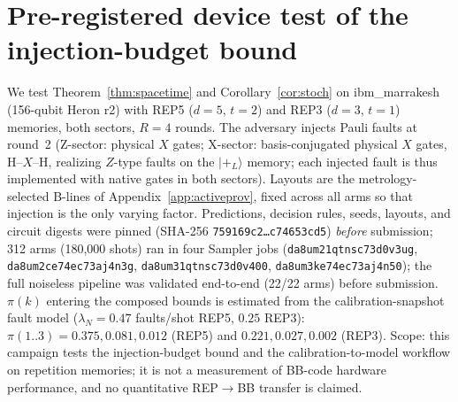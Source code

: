 \documentclass[11pt,a4paper]{article}
\begin{document}
\section{Pre-registered device test of the injection-budget bound}
\label{app:injection}

We test Theorem~\ref{thm:spacetime} and Corollary~\ref{cor:stoch} on
ibm\_marrakesh (156-qubit Heron r2) with REP5 ($d{=}5$, $t{=}2$) and
REP3 ($d{=}3$, $t{=}1$) memories, both sectors, $R{=}4$ rounds.
The adversary injects Pauli faults at round~2 (Z-sector: physical $X$
gates; X-sector: basis-conjugated physical $X$ gates, H--$X$--H, realizing
$Z$-type faults on the $\lvert +_L \rangle$ memory; each injected fault is
thus implemented with native gates in both sectors). Layouts are the metrology-selected B-lines of
Appendix~\ref{app:activeprov}, fixed across all arms so that injection
is the only varying factor. Predictions, decision rules, seeds,
layouts, and circuit digests were pinned (SHA-256
\texttt{759169c2\dots c74653cd5}) \emph{before} submission; 312 arms
(180{,}000 shots) ran in four Sampler jobs
(\texttt{da8um21qtnsc73d0v3ug}, \texttt{da8um2ce74ec73aj4n3g},
\texttt{da8um31qtnsc73d0v400}, \texttt{da8um3ke74ec73aj4n50}); the full
noiseless pipeline was validated end-to-end (22/22 arms) before
submission. $\pi(k)$ entering the composed bounds is estimated from the
calibration-snapshot fault model ($\lambda_N{=}0.47$ faults/shot REP5,
$0.25$ REP3): $\pi(1..3)=0.375, 0.081, 0.012$ (REP5) and
$0.221, 0.027, 0.002$ (REP3). Scope: this campaign tests the
injection-budget bound and the calibration-to-model workflow on
repetition memories; it is not a measurement of BB-code hardware
performance, and no quantitative REP$\to$BB transfer is claimed.
\end{document}
